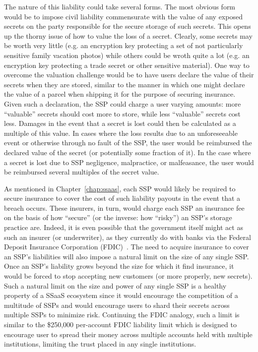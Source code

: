 The nature of this liability could take several forms. The most
obvious form would be to impose civil liability commensurate with the
value of any exposed secrets on the party responsible for the secure
storage of such secrets. This opens up the thorny issue of how to
value the loss of a secret. Clearly, some secrets may be worth very
little (e.g. an encryption key protecting a set of not particularly
sensitive family vacation photos) while others could be wroth quite a
lot (e.g. an encryption key protecting a trade secret or other
sensitive material). One way to overcome the valuation challenge would
be to have users declare the value of their secrets when they are
stored, similar to the manner in which one might declare the value of
a parcel when shipping it for the purpose of securing insurance. Given
such a declaration, the SSP could charge a user varying amounts: more
``valuable'' secrets should cost more to store, while less
``valuable'' secrets cost less. Damages in the event that a secret is
lost could then be calculated as a multiple of this value. In cases
where the loss results due to an unforeseeable event or otherwise
through no fault of the SSP, the user would be reimbursed the declared
value of the secret (or potentially some fraction of it). In the case
where a secret is lost due to SSP negligence, malpractice, or
malfeasance, the user would be reimbursed several multiples of the
secret value.

As mentioned in Chapter~\ref{chap:ssaas}, each SSP would likely be
required to secure insurance to cover the cost of such liability
payouts in the event that a breach occurs. These insurers, in turn,
would charge each SSP an insurance fee on the basis of how ``secure''
(or the inverse: how ``risky'') an SSP's storage practice are. Indeed,
it is even possible that the government itself might act as such an
insurer (or underwriter), as they currently do with banks via the
Federal Deposit Insurance Corporation (FDIC)~\cite{fdic}. The need to
acquire insurance to cover an SSP's liabilities will also impose a
natural limit on the size of any single SSP. Once an SSP's liability
grows beyond the size for which it find insurance, it would be forced
to stop accepting new customers (or more properly, new secrets). Such
a natural limit on the size and power of any single SSP is a healthy
property of a SSaaS ecosystem since it would encourage the competition
of a multitude of SSPs and would encourage users to shard their
secrets across multiple SSPs to minimize risk. Continuing the FDIC
analogy, such a limit is similar to the \$250,000 per-account FDIC
liability limit which is designed to encourage user to spread their
money across multiple accounts held with multiple institutions,
limiting the trust placed in any single institutions.

